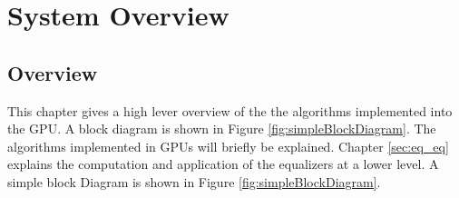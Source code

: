 

\chapter{System Overview}
\label{sec:systemOverview}

\section{Overview}
This chapter gives a high lever overview of the the algorithms implemented into the GPU. 
A block diagram is shown in Figure \ref{fig:simpleBlockDiagram}.
The algorithms implemented in GPUs will briefly be explained.
Chapter \ref{sec:eq_eq} explains the computation and application of the equalizers at a lower level.
A simple block Diagram is shown in Figure \ref{fig:simpleBlockDiagram}.

